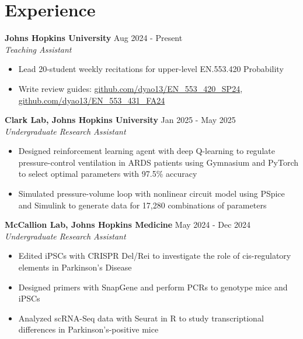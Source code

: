 \documentclass[11pt]{article}       %
\begin{document}
\vspace{-9pt}

\section*{Experience}

\textbf{Johns Hopkins University} \hfill Aug 2024 - Present \\
\textit{Teaching Assistant} \vspace{-9pt} \\
\begin{itemize}
  \item Lead 20-student weekly recitations for upper-level EN.553.420 Probability
  \item Write review guides: \href{https://github.com/dyao13/EN_553_420_SP24}{github.com/dyao13/EN\_553\_420\_SP24}, \href{https://github.com/dyao13/EN_553_431_FA24}{github.com/dyao13/EN\_553\_431\_FA24}
\end{itemize}

\textbf{Clark Lab, Johns Hopkins University} \hfill Jan 2025 - May 2025 \\
\textit{Undergraduate Research Assistant} \vspace{-9pt} \\
\begin{itemize}
  \item Designed reinforcement learning agent with deep Q-learning to regulate pressure-control ventilation in ARDS patients using Gymnasium and PyTorch to select optimal parameters with 97.5\% accuracy
  \item Simulated pressure-volume loop with nonlinear circuit model using PSpice and Simulink to generate data for 17,280 combinations of parameters
\end{itemize}

\textbf{McCallion Lab, Johns Hopkins Medicine} \hfill May 2024 - Dec 2024 \\
\textit{Undergraduate Research Assistant} \vspace{-9pt} \\
\begin{itemize}
  \item Edited iPSCs with CRISPR Del/Rei to investigate the role of cis-regulatory elements in Parkinson's Disease
  \item Designed primers with SnapGene and perform PCRs to genotype mice and iPSCs
  \item Analyzed scRNA-Seq data with Seurat in R to study transcriptional differences in Parkinson's-positive mice
\end{itemize}
\end{document}
